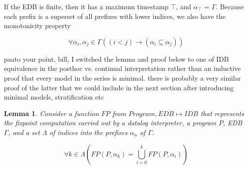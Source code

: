 If the EDB is finite, then it has a maximum timestamp $\top$, and $\alpha_{\top}$ = $\Gamma$.  Because each prefix is a superset of all 
prefixes with lower indices, we also have the monotonicity property

\begin{equation}
\forall \alpha_{i}, \alpha_{j} \in \Gamma ((i < j) \to (\alpha_{i} \subseteq \alpha_{j}))
\end{equation}

paa{to your point, bill, I switched the lemma and proof below to one of IDB equivalence in the posthoc vs. continual interpretation
rather than an inductive proof that every model in the series is minimal.  there is probably a very similar proof of the latter
that we could include in the next section after introducing minimal models, stratification etc}


\newtheorem{lemma}{Lemma} 
\begin{lemma}

Consider a function $FP$ from $Program, EDB \mapsto IDB$ that represents the \emph{fixpoint} computation carried out by a datalog interpreter,
a program $P$, EDB $\Gamma$, and a set $\Lambda$ of indices into the prefixes $\alpha_{n}$ of $\Gamma$.


\begin{equation}
\forall k \in \Lambda (FP(P, \alpha_{k}) =  \displaystyle \bigcup_{i=0}^{k} FP(P, \alpha_{i}))
\end{equation}
\end{lemma}


